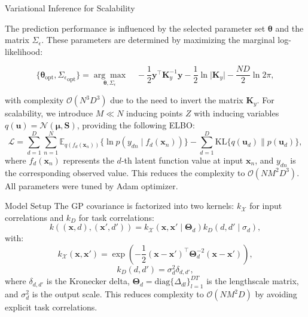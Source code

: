 \begin{frame}{Variational Inference for Scalability}

	The prediction performance is influenced by the selected parameter set \(\bm{\theta}\) and the matrix \(\Sigma_\epsilon\). These parameters are determined by maximizing the marginal log-likelihood:
	
	\begin{equation*}
		\{\bm{\theta}_{\text{opt}}, {\Sigma_\epsilon}_{\text{opt}}\} = \underset{\bm{\theta}, \Sigma_\epsilon}{\arg\max} \quad -\frac{1}{2} \mathbf{y}^\top \mathbf{K}_y^{-1} \mathbf{y} - \frac{1}{2} \ln \lvert \mathbf{K}_y \rvert - \frac{ND}{2} \ln 2\pi,
	\end{equation*}
	
	with complexity \textcolor{myNewColorB}{\(\mathcal{O}(N^3D^3)\)} due to the need to invert the matrix \(\mathbf{K}_y\).	For scalability, we introduce \(M \ll N\) inducing points \(Z\) with inducing variables $q(\mathbf{u}) = \mathcal{N}(\boldsymbol{\mu}, \mathbf{S})$, providing the following ELBO:
	\begin{equation*}
		\mathcal{L} = \sum_{d=1}^D \sum_{n=1}^N \mathbb{E}_{q(f_d(\mathbf{x}_n))}\{\ln p(y_{dn} \mid f_d(\mathbf{x}_n))\} - \sum_{d=1}^D \text{KL}\{q(\mathbf{u}_d) \parallel p(\mathbf{u}_d)\},
	\end{equation*}
	where $f_d(\mathbf{x}_n)$ represents the $d$-th latent function value at input $\mathbf{x}_n$, and $y_{dn}$ is the corresponding observed value. This reduces the complexity to \textcolor{myNewColorB}{$\mathcal{O}(NM^2D^3)$}. All parameters were tuned by Adam optimizer.
\end{frame}


\begin{frame}{Model Setup}
	The GP covariance is factorized into two kernels: $k_{\mathcal{X}}$ for input correlations and $k_{D}$ for task correlations:
	\[
	k\left((\bm{x}, d), (\bm{x}', d')\right) = k_{\mathcal{X}}\left(\bm{x}, \bm{x}' \mid \bm{\Theta}_d \right) k_{D}\left(d, d' \mid \sigma_d \right),
	\]
	with:
	\[
	k_{\mathcal{X}}\left(\bm{x}, \bm{x}'\right) = \exp\left(-\frac{1}{2}(\bm{x} - \bm{x}')^\top \bm{\Theta}_d^{-2} (\bm{x} - \bm{x}')\right),
	\]
	\[
	k_{D}(d, d') = \sigma^2_d \delta_{d, d'},
	\]
	where $\delta_{d, d'}$ is the Kronecker delta, $\bm{\Theta}_d=\text{diag}\{\Delta_{dl}\}_{l=1}^{DT}$ is the lengthscale matrix, and $\sigma^2_d$ is the output scale. This reduces complexity to \textcolor{myNewColorB}{$\mathcal{O}(NM^2D)$} by avoiding explicit task correlations.
\end{frame}



